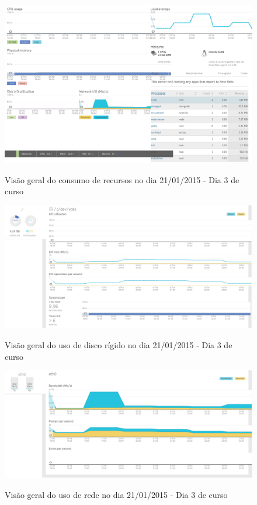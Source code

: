 \documentclass[
	12pt,				%
	oneside,			%
	a4paper,			%
	english,			%
	brazil				%
	]{abntex2ppgsi}
\begin{document}
\begin{apendicesenv}
\begin{figure}[ht]
\centering
\caption{Visão geral do consumo de recursos no dia 21/01/2015 - Dia 3 de curso}
\includegraphics[width=1.0\textwidth]{relatorios/21-01-15/dashboard_cropped.pdf} 
\label{fig:recursos_dia1_1} 
\end{figure}

\begin{figure}[ht]
\centering
\caption{Visão geral do uso de disco rígido no dia 21/01/2015 - Dia 3 de curso}
\includegraphics[width=1.0\textwidth]{relatorios/21-01-15/disk_cropped.pdf} 
\label{fig:recursos_dia1_2} 
\end{figure}

\begin{figure}[ht]
\centering
\caption{Visão geral do uso de rede no dia 21/01/2015 - Dia 3 de curso}
\includegraphics[width=1.0\textwidth]{relatorios/21-01-15/network_cropped.pdf} 
\label{fig:recursos_dia1_3} 
\end{figure}


\end{apendicesenv}
\end{document}
